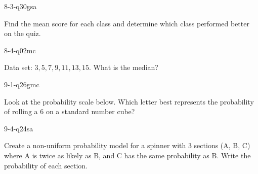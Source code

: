 \begin{practiceQuestion}{8-3-q30}{gsa}
\begin{questionText}
Find the mean score for each class and determine which class performed better on the quiz.
\end{questionText}
\end{practiceQuestion}

\begin{practiceQuestion}{8-4-q02}{mc}
\begin{questionText}
Data set: $3, 5, 7, 9, 11, 13, 15$. What is the median?
\end{questionText}
\end{practiceQuestion}

\begin{practiceQuestion}{9-1-q26}{gmc}
\begin{questionText}
Look at the probability scale below. Which letter best represents the probability of rolling a $6$ on a standard number cube?

\begin{center}
\end{center}
\end{questionText}
\end{practiceQuestion}

\begin{practiceQuestion}{9-4-q24}{sa}
\begin{questionText}
Create a non-uniform probability model for a spinner with $3$ sections (A, B, C) where A is twice as likely as B, and C has the same probability as B. Write the probability of each section.
\end{questionText}
\end{practiceQuestion}

